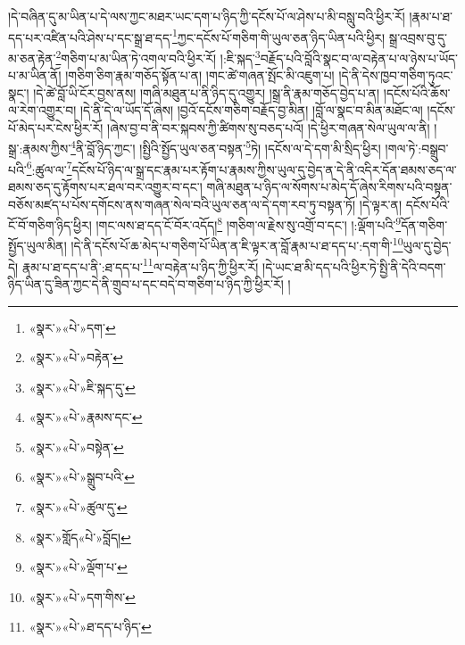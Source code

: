 །དེ་བཞིན་དུ་མ་ཡིན་པ་དེ་ལས་ཀྱང་མཐར་ཡང་དག་པ་ཉིད་ཀྱི་དངོས་པོ་ལ་ཤེས་པ་མི་བསླུ་བའི་ཕྱིར་རོ། །རྣམ་པ་ཐ་དད་པར་འཛིན་པའི་ཤེས་པ་དང་སྒྲ་ཐ་དད་\footnote{«སྣར་»«པེ་»དག་}ཀྱང་དངོས་པོ་གཅིག་གི་ཡུལ་ཅན་ཉིད་ཡིན་པའི་ཕྱིར། སྒྲ་འབྲས་བུ་དུ་མ་ཅན་རྟེན་\footnote{«སྣར་»«པེ་»བརྟེན་}གཅིག་པ་མ་ཡིན་ཏེ་འགལ་བའི་ཕྱིར་རོ། །:ཇི་སྐད་\footnote{«སྣར་»«པེ་»ཇི་སྐད་དུ་}བརྗོད་པའི་བློའི་སྣང་བ་ལ་བརྟེན་པ་ལ་ཉེས་པ་ཡོད་པ་མ་ཡིན་ནོ། །གཅིག་ཅིག་རྣམ་གཅོད་སྟོན་པ་ན། །གང་ཚེ་གཞན་སྤོང་མི་འཇུག་པ། །དེ་ནི་དེས་ཁྱབ་གཅིག་ཏུའང་སྣང་། །དེ་ཚེ་བློ་ཡི་ངོར་བྱས་ནས། །གཞི་མཐུན་པ་ནི་ཉིད་དུ་འགྱུར། །སྒྲ་ནི་རྣམ་གཅོད་བྱེད་པ་ན། །དངོས་པོའི་ཆོས་ལ་རེག་འགྱུར་བ། །དེ་ནི་དེ་ལ་ཡོད་དོ་ཞེས། །བྱའོ་དངོས་གཅིག་བརྗོད་བྱ་མིན། །བློ་ལ་སྣང་བ་མིན་མཐོང་ལ། །དངོས་པོ་མེད་པར་ངེས་ཕྱིར་རོ། །ཞེས་བྱ་བ་ནི་བར་སྐབས་ཀྱི་ཚིགས་སུ་བཅད་པའོ། །དེ་ཕྱིར་གཞན་སེལ་ཡུལ་ལ་ནི། །སྒྲ་:རྣམས་ཀྱིས་\footnote{«སྣར་»«པེ་»རྣམས་དང་}ནི་བློ་ཉིད་ཀྱང་། །སྤྱིའི་སྤྱོད་ཡུལ་ཅན་བསྟན་\footnote{«སྣར་»«པེ་»བསྟེན་}ཏེ། །དངོས་ལ་དེ་དག་མི་སྲིད་ཕྱིར། །གལ་ཏེ་:བསྒྲུབ་པའི་\footnote{«སྣར་»«པེ་»སྒྲུབ་པའི་}:ཚུལ་ལ་\footnote{«སྣར་»«པེ་»ཚུལ་དུ་}དངོས་པོ་ཉིད་ལ་སྒྲ་དང་རྣམ་པར་རྟོག་པ་རྣམས་ཀྱིས་ཡུལ་དུ་བྱེད་ན་དེ་ནི་འདིར་དོན་ཐམས་ཅད་ལ་ཐམས་ཅད་དུ་རྟོགས་པར་ཐལ་བར་འགྱུར་བ་དང་། གཞི་མཐུན་པ་ཉིད་ལ་སོགས་པ་མེད་དོ་ཞེས་རིགས་པའི་བསྟན་བཅོས་མཛད་པ་པོས་དགོངས་ནས་གཞན་སེལ་བའི་ཡུལ་ཅན་ལ་དེ་དག་རབ་ཏུ་བསྟན་ཏོ། །དེ་ལྟར་ན། དངོས་པོའི་ངོ་བོ་གཅིག་ཉིད་ཕྱིར། །གང་ལས་ཐ་དད་ངོ་བོར་འདོད།\footnote{«སྣར་»གློད«པེ་»བློད།} །གཅིག་ལ་རྗེས་སུ་འགྲོ་བ་དང་། །:ལྡོག་པའི་\footnote{«སྣར་»«པེ་»ལྡོག་པ་}དོན་གཅིག་སྤྱོད་ཡུལ་མིན། །དེ་ནི་དངོས་པོ་ཆ་མེད་པ་གཅིག་པོ་ཡིན་ན་ཇི་ལྟར་ན་བློ་རྣམ་པ་ཐ་དད་པ་:དག་གི་\footnote{«སྣར་»«པེ་»དག་གིས་}ཡུལ་དུ་བྱེད་དེ། རྣམ་པ་ཐ་དད་པ་ནི་:ཐ་དད་པ་\footnote{«སྣར་»«པེ་»ཐ་དད་པ་ཉིད་}ལ་བརྟེན་པ་ཉིད་ཀྱི་ཕྱིར་རོ། །དེ་ཡང་ཐ་མི་དད་པའི་ཕྱིར་ཏེ་སྤྱི་ནི་དེའི་བདག་ཉིད་ཡིན་དུ་ཟིན་ཀྱང་དེ་ནི་གྲུབ་པ་དང་བདེ་བ་གཅིག་པ་ཉིད་ཀྱི་ཕྱིར་རོ། །
